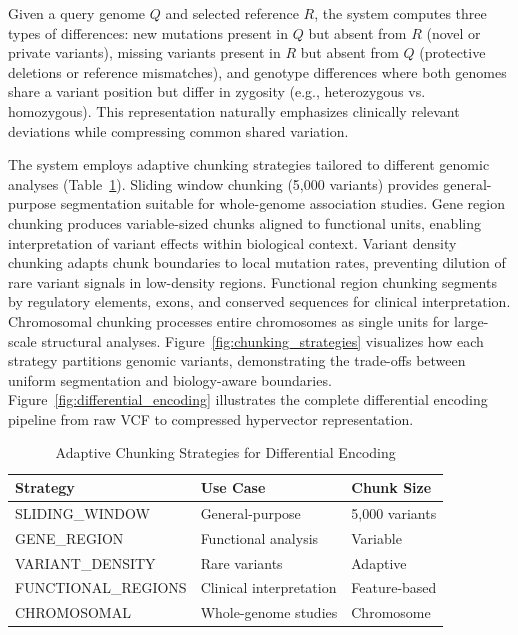 \documentclass[11pt,letterpaper]{article}
\begin{document}
Given a query genome $Q$ and selected reference $R$, the system computes three types of differences: new mutations present in $Q$ but absent from $R$ (novel or private variants), missing variants present in $R$ but absent from $Q$ (protective deletions or reference mismatches), and genotype differences where both genomes share a variant position but differ in zygosity (e.g., heterozygous vs. homozygous). This representation naturally emphasizes clinically relevant deviations while compressing common shared variation.

The system employs adaptive chunking strategies tailored to different genomic analyses (Table~\ref{tab:chunking_strategies}). Sliding window chunking (5,000 variants) provides general-purpose segmentation suitable for whole-genome association studies. Gene region chunking produces variable-sized chunks aligned to functional units, enabling interpretation of variant effects within biological context. Variant density chunking adapts chunk boundaries to local mutation rates, preventing dilution of rare variant signals in low-density regions. Functional region chunking segments by regulatory elements, exons, and conserved sequences for clinical interpretation. Chromosomal chunking processes entire chromosomes as single units for large-scale structural analyses. Figure~\ref{fig:chunking_strategies} visualizes how each strategy partitions genomic variants, demonstrating the trade-offs between uniform segmentation and biology-aware boundaries. Figure~\ref{fig:differential_encoding} illustrates the complete differential encoding pipeline from raw VCF to compressed hypervector representation.

\begin{table}[!ht]
\centering
\caption{Adaptive Chunking Strategies for Differential Encoding}
\label{tab:chunking_strategies}
\begin{tabular}{lll}
\toprule
\textbf{Strategy} & \textbf{Use Case} & \textbf{Chunk Size} \\
\midrule
SLIDING\_WINDOW & General-purpose & 5,000 variants \\
GENE\_REGION & Functional analysis & Variable \\
VARIANT\_DENSITY & Rare variants & Adaptive \\
FUNCTIONAL\_REGIONS & Clinical interpretation & Feature-based \\
CHROMOSOMAL & Whole-genome studies & Chromosome \\
\bottomrule
\end{tabular}
\end{table}
\end{document}
